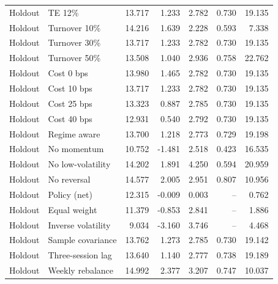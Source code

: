 \documentclass[11pt,a4paper]{article}
\begin{document}
\begin{center}
\begin{longtable}{@{}llrrrrr@{}}
Holdout & TE 12\% & 13.717 & 1.233 & 2.782 & 0.730 & 19.135\\

Holdout & Turnover 10\% & 14.216 & 1.639 & 2.228 & 0.593 & 7.338\\

Holdout & Turnover 30\% & 13.717 & 1.233 & 2.782 & 0.730 & 19.135\\

Holdout & Turnover 50\% & 13.508 & 1.040 & 2.936 & 0.758 & 22.762\\

Holdout & Cost 0 bps & 13.980 & 1.465 & 2.782 & 0.730 & 19.135\\

Holdout & Cost 10 bps & 13.717 & 1.233 & 2.782 & 0.730 & 19.135\\

Holdout & Cost 25 bps & 13.323 & 0.887 & 2.785 & 0.730 & 19.135\\

Holdout & Cost 40 bps & 12.931 & 0.540 & 2.792 & 0.730 & 19.135\\

Holdout & Regime aware & 13.700 & 1.218 & 2.773 & 0.729 & 19.198\\

Holdout & No momentum & 10.752 & -1.481 & 2.518 & 0.423 & 16.535\\

Holdout & No low-volatility & 14.202 & 1.891 & 4.250 & 0.594 & 20.959\\

Holdout & No reversal & 14.577 & 2.005 & 2.951 & 0.807 & 10.956\\

Holdout & Policy (net) & 12.315 & -0.009 & 0.003 & -- & 0.762\\

Holdout & Equal weight & 11.379 & -0.853 & 2.841 & -- & 1.886\\

Holdout & Inverse volatility & 9.034 & -3.160 & 3.746 & -- & 4.468\\

Holdout & Sample covariance & 13.762 & 1.273 & 2.785 & 0.730 & 19.142\\

Holdout & Three-session lag & 13.640 & 1.140 & 2.777 & 0.738 & 19.189\\

Holdout & Weekly rebalance & 14.992 & 2.377 & 3.207 & 0.747 & 10.037\\

\bottomrule\end{longtable}\end{center}
\end{document}
